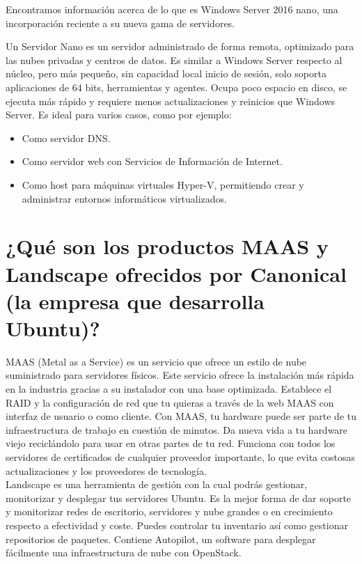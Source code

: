 	Encontramos información acerca de lo que es Windows Server 2016 nano\cite{sexto}, una incorporación reciente a su nueva gama de servidores.
	
	Un Servidor Nano es un servidor administrado de forma remota, optimizado para las nubes privadas y centros de datos. Es similar a Windows Server respecto al núcleo, pero más pequeño, sin capacidad local inicio de sesión, solo soporta aplicaciones de 64 bits, herramientas y agentes. Ocupa poco espacio en disco, se ejecuta más rápido y requiere menos actualizaciones y reinicios que Windows Server. Es ideal para varios casos, como por ejemplo:
	
	\begin{itemize}
		\item Como servidor DNS.
		\item Como servidor web con Servicios de Información de Internet.
		\item Como host para máquinas virtuales Hyper-V\cite{septimo}, permitiendo crear y administrar entornos informáticos virtualizados. 
	\end{itemize}
	

	\section{¿Qué son los productos MAAS y Landscape ofrecidos por Canonical (la empresa que desarrolla Ubuntu)?}
	
	
	MAAS (Metal as a Service)\cite{octavo,noveno} es un servicio que ofrece un estilo de nube suministrado para servidores físicos. Este servicio ofrece la instalación más rápida en la industria gracias a su instalador con una base optimizada. Establece el RAID y la configuración de red que tu quieras a través de la web MAAS con interfaz de usuario o como cliente. Con MAAS, tu hardware puede ser parte de tu infraestructura de trabajo en cuestión de minutos. Da nueva vida a tu hardware viejo reciclándolo para usar en otras partes de tu red. Funciona con todos los servidores de certificados de cualquier proveedor importante,  lo que evita costosas actualizaciones y los proveedores de tecnología.
	\\
	
	Landscape\cite{decimo} es una herramienta de gestión con la cual podrás gestionar, monitorizar y desplegar tus servidores Ubuntu. Es la mejor forma de dar soporte y monitorizar redes de escritorio, servidores y nube grandes o en crecimiento respecto a efectividad y coste. Puedes controlar tu inventario así como gestionar repositorios de paquetes. Contiene Autopilot, un software para desplegar fácilmente una infraestructura de nube con OpenStack. 
	
